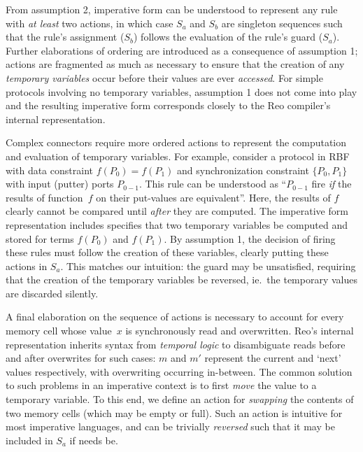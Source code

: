 From assumption 2, imperative form can be understood to represent any rule with \textit{at least} two actions, in which case $S_a$ and $S_b$ are singleton sequences such that the rule's assignment ($S_b$) follows the evaluation of the rule's guard ($S_a$). Further elaborations of ordering are introduced as a consequence of assumption 1; actions are fragmented as much as necessary to ensure that the creation of any \textit{temporary variables} occur before their values are ever \textit{accessed}. For simple protocols involving no temporary variables, assumption 1 does not come into play and the resulting imperative form corresponds closely to the Reo compiler's internal representation.

Complex connectors require more ordered actions to represent the computation and evaluation of temporary variables. For example, consider a protocol in RBF with data constraint $f(P_0)=f(P_1)$ and synchronization constraint $\{P_0, P_1\}$ with input (putter) ports $P_{0-1}$. This rule can be understood as ``$P_{0-1}$ fire \textit{if} the results of function~$f$ on their put-values are equivalent''. Here, the results of $f$ clearly cannot be compared until \textit{after} they are computed. The imperative form representation includes specifies that two temporary variables be computed and stored for terms $f(P_0)$ and $f(P_1)$. By assumption 1, the decision of firing these rules must follow the creation of these variables, clearly putting these actions in $S_a$. This matches our intuition: the guard may be unsatisfied, requiring that the creation of the temporary variables be reversed, ie.\ the temporary values are discarded silently.

A final elaboration on the sequence of actions is necessary to account for every memory cell whose value~$x$ is synchronously read and overwritten. Reo's internal representation inherits syntax from \textit{temporal logic} to disambiguate reads before and after overwrites for such cases: $m$ and $m'$ represent the current and `next' values respectively, with overwriting occurring in-between. The common solution to such problems in an imperative context is to first \textit{move} the value to a temporary variable. To this end, we define an action for \textit{swapping} the contents of two memory cells (which may be empty or full). Such an action is intuitive for most imperative languages, and can be trivially \textit{reversed} such that it may be included in $S_a$ if needs be.

